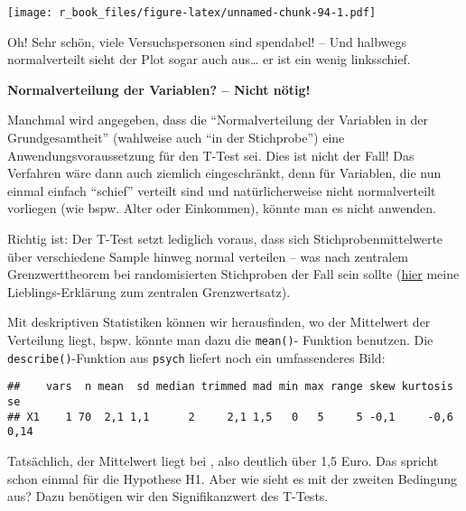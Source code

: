 \documentclass[
]{book}
\newenvironment{Shaded}{\begin{snugshade}}{\end{snugshade}}
\newcommand{\FunctionTok}[1]{\textcolor[rgb]{0.00,0.00,0.00}{#1}}
\newcommand{\NormalTok}[1]{#1}
\newcommand{\SpecialCharTok}[1]{\textcolor[rgb]{0.00,0.00,0.00}{#1}}
\begin{document}
\texttt{[image: r\_book\_files/figure-latex/unnamed-chunk-94-1.pdf]}

Oh! Sehr schön, viele Versuchspersonen sind spendabel! -- Und halbwegs normalverteilt sieht der Plot sogar auch aus\ldots{} er ist ein wenig linksschief.

\leavevmode\hypertarget{info_levene}{}%
\textbf{Normalverteilung der Variablen? -- Nicht nötig!}

Manchmal wird angegeben, dass die ``Normalverteilung der Variablen in der Grundgesamtheit'' (wahlweise auch ``in der Stichprobe'') eine Anwendungsvoraussetzung für den T-Test sei. Dies ist nicht der Fall! Das Verfahren wäre dann auch ziemlich eingeschränkt, denn für Variablen, die nun einmal einfach ``schief'' verteilt sind und natürlicherweise nicht normalverteilt vorliegen (wie bspw. Alter oder Einkommen), könnte man es nicht anwenden.

Richtig ist: Der T-Test setzt lediglich voraus, dass sich Stichprobenmittelwerte über verschiedene Sample hinweg normal verteilen -- was nach zentralem Grenzwerttheorem bei randomisierten Stichproben der Fall sein sollte (\href{https://www.youtube.com/watch?v=jvoxEYmQHNM}{hier} meine Lieblings-Erklärung zum zentralen Grenzwertsatz).

Mit deskriptiven Statistiken können wir herausfinden, wo der Mittelwert der Verteilung liegt, bspw. könnte man dazu die \texttt{mean()}- Funktion benutzen. Die \texttt{describe()}-Funktion aus \texttt{psych} liefert noch ein umfassenderes Bild:

\begin{Shaded}
\end{Shaded}

\begin{verbatim}
##    vars  n mean  sd median trimmed mad min max range skew kurtosis   se
## X1    1 70  2,1 1,1      2     2,1 1,5   0   5     5 -0,1     -0,6 0,14
\end{verbatim}

Tatsächlich, der Mittelwert liegt bei , also deutlich über 1,5 Euro. Das spricht schon einmal für die Hypothese H1. Aber wie sieht es mit der zweiten Bedingung aus? Dazu benötigen wir den Signifikanzwert des T-Tests.
\end{document}
